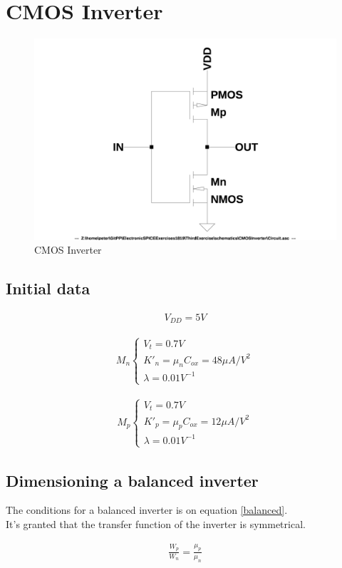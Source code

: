 \chapter{CMOS Inverter}
\begin{figure}[h]
  \centering
  \includegraphics[width=12cm]{schematics/CMOSInverter/Circuit.jpg}
  \caption{CMOS Inverter}
  \label{CMOSInverterCircuit}
\end{figure}
  
\section{Initial data} \label{CIInitialData}
\begin{align}
V_{DD} = 5V
\end{align}

\begin{align} \label{mn}
M_n \left\{
\begin{array}{l}
V_t = 0.7V\\
K'_n = \mu _n C_{ox} = 48 \mu A / V^2\\
\lambda = 0.01 V^{-1}
\end{array}
\right.
\end{align}

\begin{align} \label{mp}
M_p \left\{
\begin{array}{l}
V_t = 0.7V\\
K'_p = \mu _p C_{ox} = 12 \mu A / V^2\\
\lambda = 0.01 V^{-1}
\end{array}
\right.
\end{align}

\section{Dimensioning a balanced inverter}
The conditions for a balanced inverter is on equation \ref{balanced}.\\
It's granted that the transfer function of the inverter is symmetrical.\par
\begin{align}
\frac{W_p}{W_n} = \frac{\mu _p}{\mu _n} \label{balanced}
\end{align}

